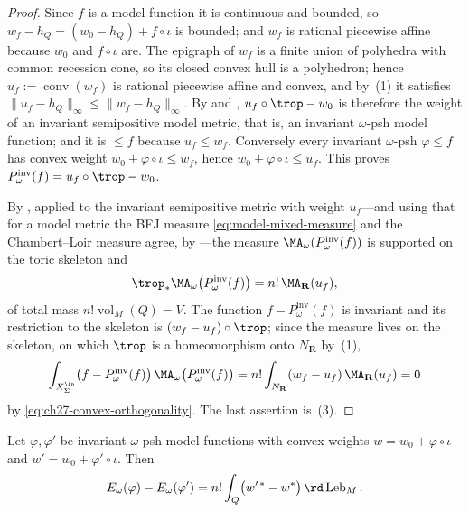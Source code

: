 \begin{proof}
Since \(f\) is a model function it is continuous and bounded, so
\(w_f-h_Q=(w_0-h_Q)+f\circ\iota\) is bounded; and \(w_f\) is rational
piecewise affine because \(w_0\) and \(f\circ\iota\) are.  The epigraph of
\(w_f\) is a finite union of polyhedra with common recession cone, so its
closed convex hull is a polyhedron; hence \(u_f:=\operatorname{conv}(w_f)\)
is rational piecewise affine and convex, and by
\,(1) it satisfies
\(\lVert u_f-h_Q\rVert_\infty\leq\lVert w_f-h_Q\rVert_\infty\).  By
 and ,
\(u_f\circ\trop-w_0\) is therefore the weight of an invariant semipositive
model metric, that is, an invariant \(\omega\)-psh model function; and it is
\(\leq f\) because \(u_f\leq w_f\).  Conversely every invariant
\(\omega\)-psh \(\varphi\leq f\) has convex weight \(w_0+\varphi\circ\iota
\leq w_f\), hence \(w_0+\varphi\circ\iota\leq u_f\).  This proves
\(P^{\mathrm{inv}}_\omega(f)=u_f\circ\trop-w_0\).

By , applied to the invariant semipositive metric
with weight \(u_f\)---and using that for a model metric the BFJ measure
\eqref{eq:model-mixed-measure} and the Chambert--Loir measure agree, by
---the measure
\(\MA_\omega(P^{\mathrm{inv}}_\omega(f))\) is supported on the toric skeleton and
\[
 \trop_*\MA_\omega\bigl(P^{\mathrm{inv}}_\omega(f)\bigr)=n!\,\MA_{\mathbf R}(u_f),
\]
of total mass \(n!\operatorname{vol}_M(Q)=V\).  The function
\(f-P^{\mathrm{inv}}_\omega(f)\) is invariant and its restriction to the skeleton is
\((w_f-u_f)\circ\trop\); since the measure lives on the skeleton, on which
\(\trop\) is a homeomorphism onto \(N_{\mathbf R}\) by
\,(1),
\[
 \int_{X_\Sigma^{\An}}\bigl(f-P^{\mathrm{inv}}_\omega(f)\bigr)\,
   \MA_\omega\bigl(P^{\mathrm{inv}}_\omega(f)\bigr)
 =n!\int_{N_{\mathbf R}}(w_f-u_f)\,\MA_{\mathbf R}(u_f)=0
\]
by \eqref{eq:ch27-convex-orthogonality}.  The last assertion is
\,(3).
\end{proof}

\begin{corollary}
\label{cor:ch27-toric-energy}
Let \(\varphi,\varphi'\) be invariant \(\omega\)-psh model functions with
convex weights \(w=w_0+\varphi\circ\iota\) and
\(w'=w_0+\varphi'\circ\iota\).  Then
\begin{equation}\label{eq:ch27-toric-energy}
 E_\omega(\varphi)-E_\omega(\varphi')
 =n!\int_Q\bigl(w'^{\,*}-w^{*}\bigr)\,\rd\operatorname{Leb}_M .
\end{equation}
\end{corollary}

